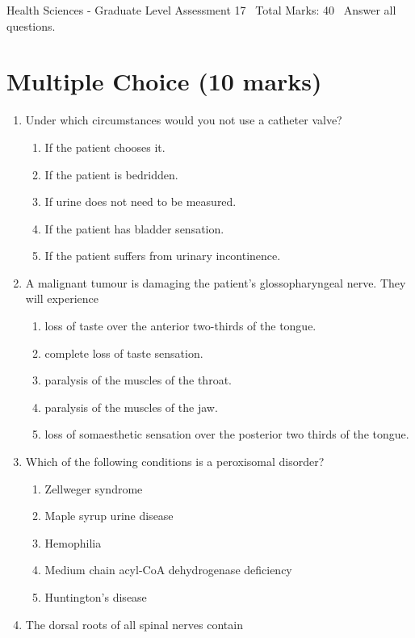 \documentclass[12pt]{article}
\begin{document}
\begin{center}
Health Sciences - Graduate Level Assessment 17 \
Total Marks: 40 \
Answer all questions.
\end{center}

\section*{Multiple Choice (10 marks)}
\begin{enumerate}[label=\arabic*.]
\item Under which circumstances would you not use a catheter valve?
\begin{enumerate}[label=(\alph*)]
    \item If the patient chooses it.
    \item If the patient is bedridden.
    \item If urine does not need to be measured.
    \item If the patient has bladder sensation.
    \item If the patient suffers from urinary incontinence.
\end{enumerate}
\item A malignant tumour is damaging the patient's glossopharyngeal nerve. They will experience
\begin{enumerate}[label=(\alph*)]
    \item loss of taste over the anterior two-thirds of the tongue.
    \item complete loss of taste sensation.
    \item paralysis of the muscles of the throat.
    \item paralysis of the muscles of the jaw.
    \item loss of somaesthetic sensation over the posterior two thirds of the tongue.
\end{enumerate}
\item Which of the following conditions is a peroxisomal disorder?
\begin{enumerate}[label=(\alph*)]
    \item Zellweger syndrome
    \item Maple syrup urine disease
    \item Hemophilia
    \item Medium chain acyl-CoA dehydrogenase deficiency
    \item Huntington's disease
\end{enumerate}
\item The dorsal roots of all spinal nerves contain

\end{enumerate}
\end{document}
